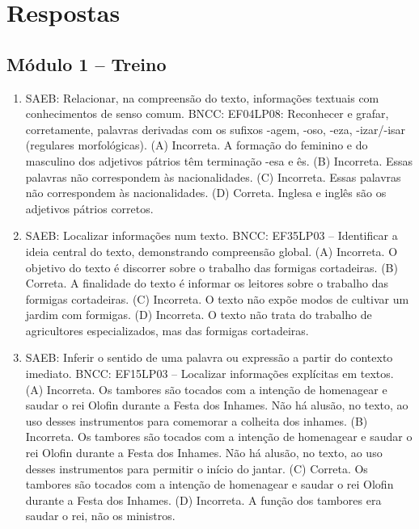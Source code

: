 
\chapter{Respostas}
\pagestyle{plain}
\footnotesize

\pagecolor{gray!40}

\section*{Módulo 1 – Treino}

\begin{enumerate}
\item
SAEB: Relacionar, na compreensão do texto, informações textuais
com conhecimentos de senso comum.
BNCC: EF04LP08: Reconhecer e grafar, corretamente, palavras derivadas
com os sufixos -agem, -oso, -eza, -izar/-isar (regulares morfológicas).
(A) Incorreta. A formação do feminino e do masculino dos adjetivos
pátrios têm terminação -esa e ês.
(B) Incorreta. Essas palavras não correspondem às nacionalidades.
(C) Incorreta. Essas palavras não correspondem às nacionalidades.
(D) Correta. Inglesa e inglês são os adjetivos pátrios corretos.

\item
SAEB: Localizar informações num texto.
BNCC: EF35LP03 -- Identificar a ideia central do texto, demonstrando
compreensão global.
(A) Incorreta. O objetivo do texto é discorrer sobre o trabalho das
formigas cortadeiras.
(B) Correta. A finalidade do texto é informar os leitores sobre o
trabalho das formigas cortadeiras.
(C) Incorreta. O texto não expõe modos de cultivar um jardim com formigas.
(D) Incorreta. O texto não trata do trabalho de agricultores 
especializados, mas das formigas cortadeiras.


\item
SAEB: Inferir o sentido de uma palavra ou expressão a partir do
contexto imediato.
BNCC: EF15LP03 -- Localizar informações explícitas em textos.
(A) Incorreta. Os tambores são tocados com a intenção de homenagear e
saudar o rei Olofin durante a Festa dos Inhames. Não há alusão, no texto, ao uso desses instrumentos para comemorar a colheita dos inhames.
(B) Incorreta. Os tambores são tocados com a intenção de homenagear e
saudar o rei Olofin durante a Festa dos Inhames. Não há alusão, no texto, ao uso desses instrumentos para permitir o início do jantar.
(C) Correta. Os tambores são tocados com a intenção de homenagear e
saudar o rei Olofin durante a Festa dos Inhames.
(D) Incorreta. A função dos tambores era saudar o rei, não os ministros.
\end{enumerate}

